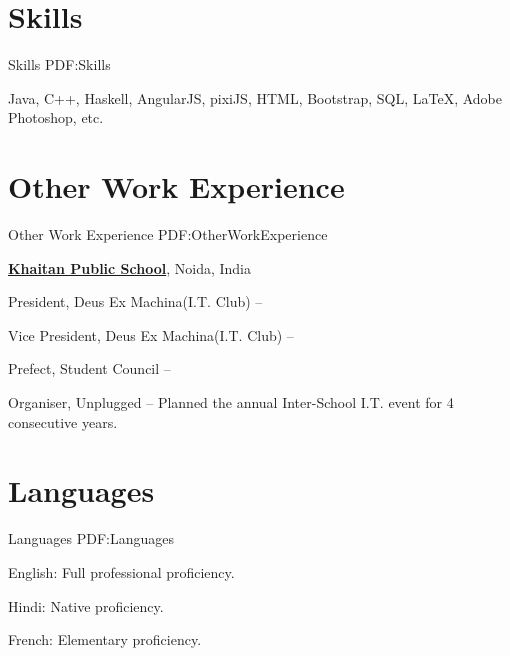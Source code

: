 \documentclass[letterpaper,10pt,oneside]{article}
\begin{document}
\begin{body}

\section
{Skills}
{Skills}
{PDF:Skills}

Java,
C++,
Haskell,
\newline
AngularJS,
pixiJS,
HTML,
Bootstrap,
SQL,
\newline
{\LaTeX},
Adobe Photoshop, etc.


\section
{Other Work\newline
Experience}
{Other Work Experience}
{PDF:OtherWorkExperience}

\href{http://www.thekhaitanschool.org}
{\textbf{Khaitan Public School}},
Noida, India

\GapNoBreak
\BulletItem
President,
Deus Ex Machina(I.T. Club)
\hfill
{} --

\GapNoBreak

\BulletItem
Vice President,
Deus Ex Machina(I.T. Club)
\hfill
{} --

\GapNoBreak

\BulletItem
Prefect,
Student Council
\hfill
{} --

\GapNoBreak

\BulletItem
Organiser,
Unplugged
\hfill
{} --
\GapNoBreak
\SubBulletItem
Planned the annual Inter-School I.T. event for 4 consecutive years.



\section
{Languages}
{Languages}
{PDF:Languages}

\BulletItem
English: Full professional proficiency.

\GapNoBreak
\BulletItem
Hindi: Native proficiency.

\GapNoBreak
\BulletItem
French: Elementary proficiency.


\end{body}
\end{document}
